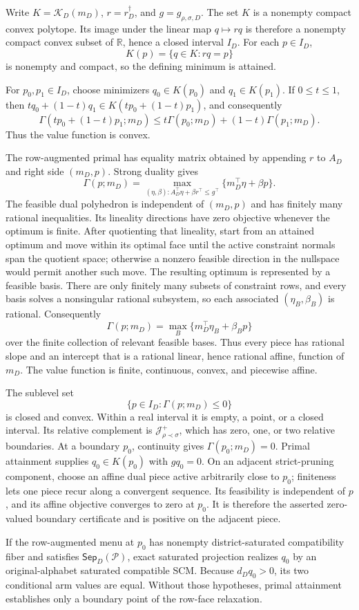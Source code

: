 Write \(K=\mathcal K_D(m_D)\), \(r=r_D^\dagger\), and \(g=g_{\rho,\sigma,D}\). The set \(K\) is a nonempty compact convex polytope. Its image under the linear map \(q\mapsto rq\) is therefore a nonempty compact convex subset of \(\mathbb R\), hence a closed interval \(I_D\). For each \(p\in I_D\),
\[
K(p)=\{q\in K:rq=p\}
\]
is nonempty and compact, so the defining minimum is attained.

For \(p_0,p_1\in I_D\), choose minimizers \(q_0\in K(p_0)\) and \(q_1\in K(p_1)\). If \(0\leq t\leq1\), then \(tq_0+(1-t)q_1\in K(tp_0+(1-t)p_1)\), and consequently
\[
\Gamma(tp_0+(1-t)p_1;m_D)
\leq t\Gamma(p_0;m_D)+(1-t)\Gamma(p_1;m_D).
\]
Thus the value function is convex.

The row-augmented primal has equality matrix obtained by appending \(r\) to \(A_D\) and right side \((m_D,p)\). Strong duality gives
\[
\Gamma(p;m_D)
=\max_{(\eta,\beta):A_D^\top\eta+\beta r^\top\leq g^\top}
\{m_D^\top\eta+\beta p\}.
\]
The feasible dual polyhedron is independent of \((m_D,p)\) and has finitely many rational inequalities. Its lineality directions have zero objective whenever the optimum is finite. After quotienting that lineality, start from an attained optimum and move within its optimal face until the active constraint normals span the quotient space; otherwise a nonzero feasible direction in the nullspace would permit another such move. The resulting optimum is represented by a feasible basis. There are only finitely many subsets of constraint rows, and every basis solves a nonsingular rational subsystem, so each associated \((\eta_B,\beta_B)\) is rational. Consequently
\[
\Gamma(p;m_D)=\max_B\{m_D^\top\eta_B+\beta_Bp\}
\]
over the finite collection of relevant feasible bases. Thus every piece has rational slope and an intercept that is a rational linear, hence rational affine, function of \(m_D\). The value function is finite, continuous, convex, and piecewise affine.

The sublevel set
\[
\{p\in I_D:\Gamma(p;m_D)\leq0\}
\]
is closed and convex. Within a real interval it is empty, a point, or a closed interval. Its relative complement is \(\mathcal J_{\rho\prec\sigma}^+\), which has zero, one, or two relative boundaries. At a boundary \(p_0\), continuity gives \(\Gamma(p_0;m_D)=0\). Primal attainment supplies \(q_0\in K(p_0)\) with \(gq_0=0\). On an adjacent strict-pruning component, choose an affine dual piece active arbitrarily close to \(p_0\); finiteness lets one piece recur along a convergent sequence. Its feasibility is independent of \(p\), and its affine objective converges to zero at \(p_0\). It is therefore the asserted zero-valued boundary certificate and is positive on the adjacent piece.

If the row-augmented menu at \(p_0\) has nonempty district-saturated compatibility fiber and satisfies \(\mathsf{Sep}_D(\mathcal P)\), exact saturated projection realizes \(q_0\) by an original-alphabet saturated compatible SCM. Because \(d_Dq_0>0\), its two conditional arm values are equal. Without those hypotheses, primal attainment establishes only a boundary point of the row-face relaxation.